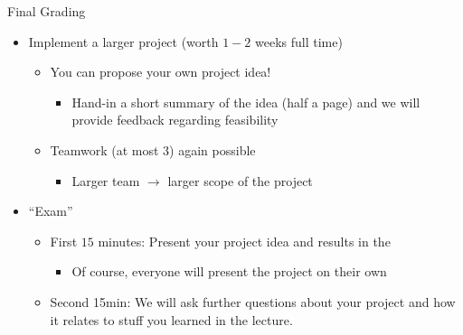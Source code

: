 \documentclass[aspectratio=169]{../latex_main/tntbeamer}  %
\begin{document}
\begin{frame}[c]{Final Grading}
	
	\begin{itemize}
		\item Implement a larger project (worth $1-2$ weeks full time)
		\begin{itemize}
			\item You can propose your own project idea!
			\begin{itemize}
				\item Hand-in a short summary of the idea (half a page) and we will provide feedback regarding feasibility
			\end{itemize}
			\item Teamwork (at most 3) again possible
			\begin{itemize}
				\item Larger team $\to$ larger scope of the project
			\end{itemize}
		\end{itemize}
		\item ``Exam''
		\begin{itemize}
			\item First $15$ minutes: Present your project idea and results in the 
			\begin{itemize}
				\item Of course, everyone will present the project on their own
			\end{itemize}
			\item Second 15min: We will ask further questions about your project and how it relates to stuff you learned in the lecture.
		\end{itemize}	
	\end{itemize}
	
\end{frame}
\end{document}
